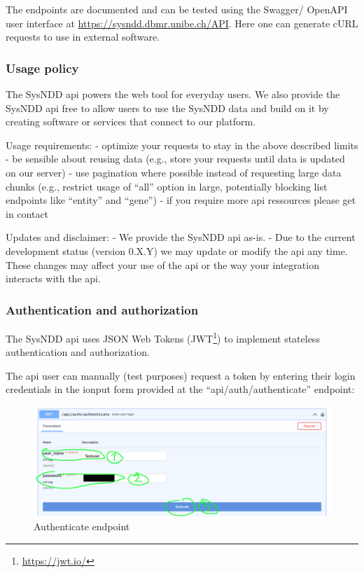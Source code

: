 \documentclass[
]{article}
\renewcommand{\href}[2]{#2\footnote{\url{#1}}}
\begin{document}
The endpoints are documented and can be tested using the Swagger/ OpenAPI user interface at \url{https://sysndd.dbmr.unibe.ch/API}.
Here one can generate cURL requests to use in external software.

\hypertarget{usage-policy}{%
\subsubsection{Usage policy}\label{usage-policy}}

The SysNDD api powers the web tool for everyday users. We also provide the SysNDD api free to allow users to use the SysNDD data and build on it by creating software or services that connect to our platform.

Usage requirements:
- optimize your requests to stay in the above described limits
- be sensible about reusing data (e.g., store your requests until data is updated on our server)
- use pagination where possible instead of requesting large data chunks (e.g., restrict usage of ``all'' option in large, potentially blocking list endpoints like ``entity'' and ``gene'')
- if you require more api ressources please get in contact

Updates and disclaimer:
- We provide the SysNDD api as-is.
- Due to the current development status (version 0.X.Y) we may update or modify the api any time. These changes may affect your use of the api or the way your integration interacts with the api.

\hypertarget{authentication-and-authorization}{%
\subsubsection{Authentication and authorization}\label{authentication-and-authorization}}

The SysNDD api uses JSON Web Tokens (\href{https://jwt.io/}{JWT}) to implement stateless authentication and authorization.

The api user can manually (test purposes) request a token by entering their login credentials in the ionput form provided at the ``api/auth/authenticate'' endpoint:

\begin{figure}
\centering
\includegraphics{./static/img/03_01-api-authenticate.png}
\caption{Authenticate endpoint}
\end{figure}
\end{document}
